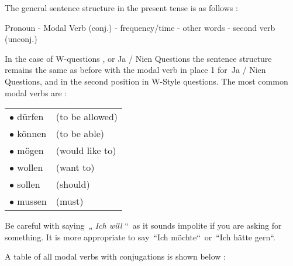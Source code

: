 \documentclass[a4paper,twocolumn,10pt]{article}
\newcommand{\newpar}
{\par \vspace{0.3cm}}
\newcommand{\bulletpoint}
{ $\bullet$  }
\begin{document}
The general sentence structure in the present tense is as follows :\newpar

Pronoun - Modal Verb (conj.) - frequency/time - other words - second verb
(unconj.)\newpar

In the case of W-questions , or Ja / Nien Questions the sentence structure
remains the same as before with the modal verb in place 1 for Ja / Nien
Questions, and in the second position in W-Style questions. The most common modal verbs
are :


\vspace{0.3cm}
\begin{tabular}{l l}

\rowcolor{white} \bulletpoint dürfen & (to be allowed)  \\
\rowcolor{white} \bulletpoint können & (to be able)  \\
\rowcolor{white} \bulletpoint mögen  & (would like to)  \\
\rowcolor{white} \bulletpoint wollen & (want to)  \\
\rowcolor{white} \bulletpoint sollen & (should)\\
\rowcolor{white} \bulletpoint mussen & (must) \\

\end{tabular}
\vspace{0.3cm}


Be careful with saying „ \textit{Ich will} “ as it sounds impolite if you are
asking for something. It is more appropriate to say “Ich möchte“ or “Ich hätte
gern“.\newpar

A table of all modal verbs with conjugations is shown below : 



\end{document}

